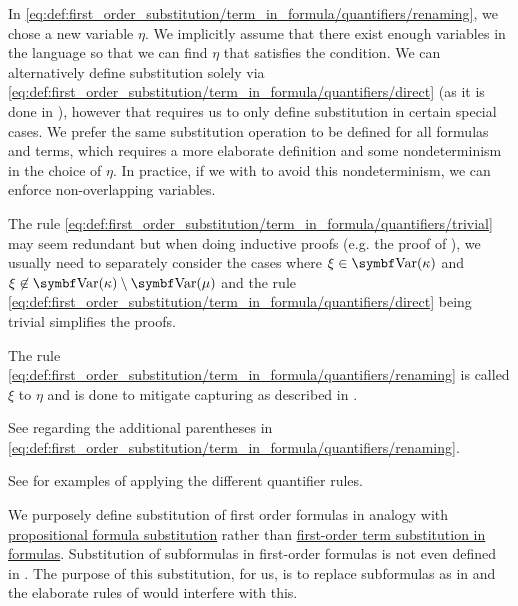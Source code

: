 \begin{definition}
\begin{DefEnum}
    In \eqref{eq:def:first_order_substitution/term_in_formula/quantifiers/renaming}, we chose a new variable \( \eta \). We implicitly assume that there exist enough variables in the language so that we can find \( \eta \) that satisfies the condition. We can alternatively define substitution solely via \eqref{eq:def:first_order_substitution/term_in_formula/quantifiers/direct} (as it is done in \cite[def. 14.25]{OpenLogic20201202}), however that requires us to only define substitution in certain special cases. We prefer the same substitution operation to be defined for all formulas and terms, which requires a more elaborate definition and some nondeterminism in the choice of \( \eta \). In practice, if we with to avoid this nondeterminism, we can enforce non-overlapping variables.

    The rule \eqref{eq:def:first_order_substitution/term_in_formula/quantifiers/trivial} may seem redundant but when doing inductive proofs (e.g. the proof of ), we usually need to separately consider the cases where \( \xi \in \Bold{Var}(\kappa) \) and \( \xi \not\in \Bold{Var}(\kappa) \setminus \Bold{Var}(\mu) \) and the rule \eqref{eq:def:first_order_substitution/term_in_formula/quantifiers/direct} being trivial simplifies the proofs.

    The rule \eqref{eq:def:first_order_substitution/term_in_formula/quantifiers/renaming} is called  \( \xi \) to \( \eta \) and is done to mitigate capturing as described in .

    See  regarding the additional parentheses in \eqref{eq:def:first_order_substitution/term_in_formula/quantifiers/renaming}.

    See  for examples of applying the different quantifier rules.

     We purposely define substitution of first order formulas in analogy with \hyperref[def:propositional_substitution/single]{propositional formula substitution} rather than \hyperref[def:first_order_substitution/term_in_formula]{first-order term substitution in formulas}. Substitution of subformulas in first-order formulas is not even defined in \cite{OpenLogic20201202}. The purpose of this substitution, for us, is to replace subformulas as in  and the elaborate rules of  would interfere with this.


\end{DefEnum}
\end{definition}
